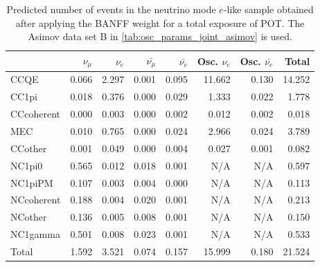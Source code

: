 
\begin{table}
\center
\begin{tabular} { | l ||r | r | r | r | r | r | | r | }
\hline
              & $\nu_\mu$            & $\nu_e$              & $\bar{\nu_\mu}$      & $\bar{\nu_e}$        & Osc. $\nu_e$         & Osc. $\bar{\nu_e}$   & Total                \\ \hline\hline
 CCQE         & 0.066                & 2.297                & 0.001                & 0.095                & 11.662               & 0.130                & 14.252               \\ \hline
 CC1pi        & 0.018                & 0.376                & 0.000                & 0.029                & 1.333                & 0.022                & 1.778                \\ \hline
 CCcoherent   & 0.000                & 0.003                & 0.000                & 0.002                & 0.012                & 0.002                & 0.018                \\ \hline
 MEC          & 0.010                & 0.765                & 0.000                & 0.024                & 2.966                & 0.024                & 3.789                \\ \hline
 CCother      & 0.001                & 0.049                & 0.000                & 0.004                & 0.027                & 0.001                & 0.082                \\ \hline
 NC1pi0       & 0.565                & 0.012                & 0.018                & 0.001                & N/A                  & N/A                  & 0.597                \\ \hline
 NC1piPM      & 0.107                & 0.003                & 0.004                & 0.000                & N/A                  & N/A                  & 0.113                \\ \hline
 NCcoherent   & 0.188                & 0.004                & 0.020                & 0.001                & N/A                  & N/A                  & 0.213                \\ \hline
 NCother      & 0.136                & 0.005                & 0.008                & 0.001                & N/A                  & N/A                  & 0.150                \\ \hline
 NC1gamma     & 0.501                & 0.008                & 0.023                & 0.001                & N/A                  & N/A                  & 0.533                \\ \hline
\hline
 Total        & 1.592                & 3.521                & 0.074                & 0.157                & 15.999               & 0.180                & 21.524               \\ \hline

\end{tabular}
\caption{
Predicted number of events in the neutrino mode $e$-like sample
obtained after applying the BANFF weight
for a total exposure of \TotalPotNuRunOneSevenC{} POT.
The Asimov data set B in \cref{tab:osc_params_joint_asimov} is used.
}
\label{tab:events_1re_Asimov_B_Run17c}
\end{table}


